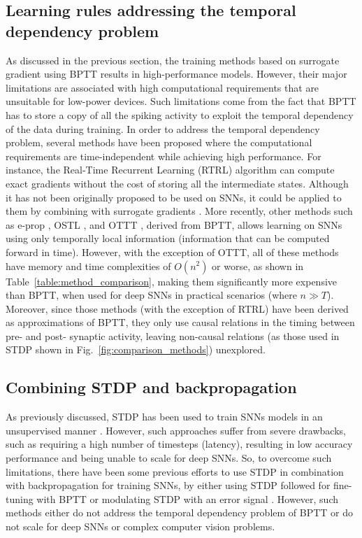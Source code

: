 \documentclass[10pt]{article} %
\begin{document}
        
    \subsection{Learning rules addressing the temporal dependency problem}\label{sec:memory_efficient_lr}
    As discussed in the previous section, the training methods based on surrogate gradient using BPTT results in high-performance models.
    However, their major limitations are associated with high computational requirements that are unsuitable for low-power devices.
    Such limitations come from the fact that BPTT has to store a copy of all the spiking activity to exploit the temporal dependency of the data during training.
    In order to address the temporal dependency problem, several methods have been proposed where the computational requirements are time-independent while achieving high performance.
    For instance, the Real-Time Recurrent Learning (RTRL) \citep{WILLIAMS1989ExperimentalAlgorithm} algorithm can compute exact gradients without the cost of storing all the intermediate states. 
    Although it has not been originally proposed to be used on SNNs, it could be applied to them by combining with surrogate gradients \citep{Neftci2019SurrogateNetworks}.
    More recently, other methods such as e-prop \citep{Bellec2020ANeurons}, OSTL \citep{Bohnstingl2022OnlineNetworks}, and
    OTTT \citep{Xiao2022OnlineNetworks}, derived from BPTT, allows learning on SNNs using only temporally local information (information that can be computed forward in time).
    However, with the exception of OTTT, all of these methods have memory and time complexities of $O(n^2)$ or worse, as shown in Table~\ref{table:method_comparison}, making them significantly more expensive than BPTT, when used for deep SNNs in practical scenarios (where $n\gg T$).
    Moreover, since those methods (with the exception of RTRL) have been derived as approximations of BPTT, they only use causal relations in the timing between pre- and post- synaptic activity, leaving non-causal relations (as those used in STDP shown in Fig.~\ref{fig:comparison_methods}) unexplored.


    \subsection{Combining STDP and backpropagation}\label{sec:stdp_bp}
    As previously discussed, STDP has been used to train SNNs models in an unsupervised manner \citep{Diehl2015UnsupervisedPlasticityb, Thiele2018Event-basedSTDP, Kheradpisheh2018STDP-basedRecognition}. However, such approaches suffer from severe drawbacks, such as requiring a high number of timesteps (latency), resulting in low accuracy performance and being unable to scale for deep SNNs.
    So, to overcome such limitations, there have been some previous efforts to use STDP in combination with backpropagation for training SNNs, by either using STDP followed for fine-tuning with BPTT \citep{Lee2018TrainingFine-tuningb} or modulating STDP with an error signal \citep{Tavanaei2019BP-STDP:Plasticity, Hu2017AnNetworks, Hao2020ARule}.
    However, such methods either do not address the temporal dependency problem of BPTT or do not scale for deep SNNs or complex computer vision problems.
    
\end{document}
